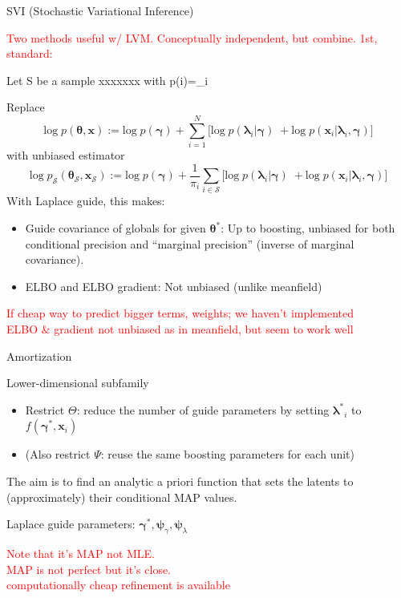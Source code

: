 \documentclass[
  ignorenonframetext,
]{beamer}
\providecommand{\tightlist}{%
  \setlength{\itemsep}{0pt}\setlength{\parskip}{0pt}}
\begin{document}
\begin{frame}{SVI (Stochastic Variational Inference)}
\protect\hypertarget{svi-stochastic-variational-inference}{}

\textcolor{red}{{\scriptsize Two methods useful w/ LVM. Conceptually independent, but combine. 1st, standard:}}

Let S be a sample xxxxxxx with p(i\inS)=\pi\_i

Replace
\[\mathrm{log}\;p(\bm{\theta},\bm{x}) := \mathrm{log}\;p(\bm{\gamma})+\sum_{i= 1}^N \Big[\mathrm{log}\;p(\bm{\lambda}_{i}|\bm{\gamma})\; +\mathrm{log}\;p(\bm{x}_{i}|\bm{\lambda}_{i},\bm{\gamma})\Big]\]
with unbiased estimator
\[\mathrm{log}\;p_\mathcal{S}(\bm{\theta}_\mathcal{S},\bm{x}_\mathcal{S}) := \mathrm{log}\;p(\bm{\gamma})+\frac{1}{\pi_{i}}\sum_{i\in \mathcal{S}} \Big[\mathrm{log}\;p(\bm{\lambda}_{i}|\bm{\gamma})\; +\mathrm{log}\;p(\bm{x}_{i}|\bm{\lambda}_{i},\bm{\gamma})\Big]\]
With Laplace guide, this makes:

\begin{itemize}
\tightlist
\item
  Guide covariance of globals for given \(\bm{\theta}^*\): Up to
  boosting, unbiased for both conditional precision and ``marginal
  precision'' (inverse of marginal covariance).
\item
  ELBO and ELBO gradient: Not unbiased (unlike meanfield)
\end{itemize}

\textcolor{red}{{\scriptsize If cheap way to predict bigger terms, weights; we haven't implemented\\ELBO \& gradient not unbiased as in meanfield, but seem to work well}}

\end{frame}

\begin{frame}{Amortization}
\protect\hypertarget{amortization}{}

Lower-dimensional subfamily

\begin{itemize}
\tightlist
\item
  Restrict \(\Theta\): reduce the number of guide parameters by setting
  \(\bm{\lambda^*}_i\) to \(f(\bm{\gamma^*},\bm{x}_i)\)
\item
  (Also restrict \(\Psi\): reuse the same boosting parameters for each
  unit)
\end{itemize}

The aim is to find an analytic a priori function that sets the latents
to (approximately) their conditional MAP values.

Laplace guide parameters:
\(\bm{\gamma}^*,\bm{\psi}_\gamma,\bm{\psi}_\lambda\)

\textcolor{red}{{\scriptsize Note that it's MAP not MLE. \\MAP is not perfect but it's close.\\computationally cheap refinement is available}}

\end{frame}
\end{document}
